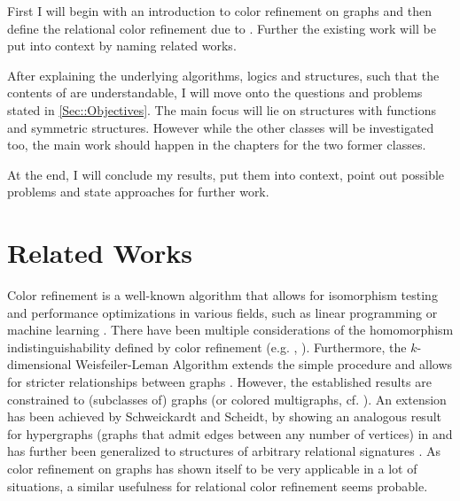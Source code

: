 \documentclass[a4paper,11pt,DIV=15]{scrartcl} %
\theoremstyle{plain}
\theoremstyle{definition}
\begin{document}
First I will begin with an introduction to color refinement on graphs and then define the relational color refinement due to \cite{scheidt2024color}.
Further the existing work will be put into context by naming related works.

After explaining the underlying algorithms, logics and structures, such that the contents of \cite{scheidt2024color} are understandable, I will move onto the questions and problems stated in \cref{Sec::Objectives}.
The main focus will lie on structures with functions and symmetric structures.
However while the other classes will be investigated too, the main work should happen in the chapters for the two former classes.

At the end, I will conclude my results, put them into context, point out possible problems and state approaches for further work.


\section{Related Works}

Color refinement is a well-known algorithm that allows for isomorphism testing and performance optimizations in various fields, such as linear programming or machine learning \cite{grohe2021color}.
There have been multiple considerations of the homomorphism indistinguishability defined by color refinement (e.g. \cite{fluck2023going}, \cite{manvcinska2020quantum}).
Furthermore, the $k$-dimensional Weisfeiler-Leman Algorithm extends the simple procedure and allows for stricter relationships between graphs \cite{kiefer2020power}.
However, the established results are constrained to (subclasses of) graphs (or colored multigraphs, cf. \cite{dell2018lov}).
An extension has been achieved by Schweickardt and Scheidt, by showing an analogous result for hypergraphs (graphs that admit edges between any number of vertices) in \cite{scheidt2023counting} and has further been generalized to structures of arbitrary relational signatures \cite{scheidt2024color}.
As color refinement on graphs has shown itself to be very applicable in a lot of situations, a similar usefulness for relational color refinement seems probable.




\end{document}
